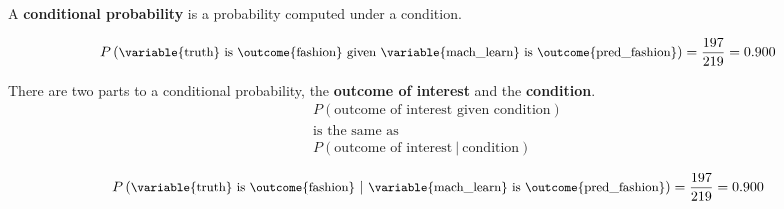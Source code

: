 \documentclass{beamer}
\newcommand{\prob}[1]{P\left({#1}\right)}
\newcommand{\condprob}[2]{\prob{{#1}~|~{#2}}}
\begin{document}
\begin{frame}
\begin{definition}
A \textbf{conditional probability} is a probability computed under a condition.
\end{definition}\pause

\begin{example}
\vspace{-4mm}
\begin{equation*}
\prob{\text{\small\variable{truth} is \outcome{fashion} given \variable{mach\_learn} is \outcome{pred\_fashion}}}=\dfrac{197}{219} = 0.900
\end{equation*}
\end{example}\pause

\begin{definition}
There are two parts to a conditional probability, the \textbf{outcome of interest} and the \textbf{condition}.
\vspace{-3mm}
\begin{equation*}
\begin{array}{c}
\prob{\text{outcome of interest given condition}}\\
\text{is the same as}\\
\condprob{\text{outcome of interest}}{\text{condition}}
\end{array}
\end{equation*}
\end{definition}\pause

\begin{example}
\vspace{-4mm}
\begin{equation*}
\condprob{\text{\small\variable{truth} is \outcome{fashion}}}{\text{\small\variable{mach\_learn} is \outcome{pred\_fashion}}}=\dfrac{197}{219} = 0.900
\end{equation*}
\end{example}
\end{frame}
\end{document}
